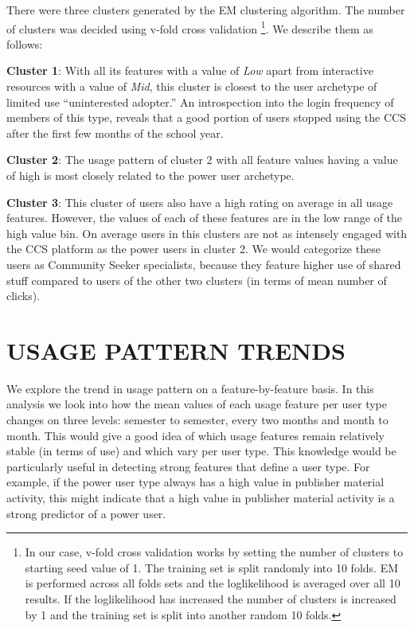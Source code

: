 \documentclass{acm_proc_article-sp}
\begin{document}
There were three clusters generated by the EM clustering algorithm. The number of clusters was decided using v-fold cross validation \footnote{In our case, v-fold cross validation works by setting the number of clusters to starting seed value of 1. The training set is split randomly into 10 folds. EM is performed across all folds sets and the loglikelihood is averaged over all 10 results. If the loglikelihood has increased the number of clusters is increased by 1 and the training set is split into another random 10 folds.}. We describe them as follows:

\textbf{Cluster 1}: With all its features with a value of \textit{Low} apart from interactive resources with a value of \textit{Mid}, this cluster is closest to the user archetype of limited use ``uninterested adopter.'' An introspection into the login frequency of members of this type, reveals that a good portion of users stopped using the CCS after the first few months of the school year.

\textbf{Cluster 2}: The usage pattern of cluster 2 with all feature values having a value of high is most closely related to the power user archetype.

\textbf{Cluster 3}: This cluster of users also have a high rating on average in all usage features. However, the values of each of these features are in the low range of the high value bin. On average users in this clusters are not as intensely engaged with the CCS platform as the power users in cluster 2. We would categorize these users as Community Seeker specialists, because they feature higher use of shared stuff compared to users of the other two clusters (in terms of mean number of clicks).

\section{USAGE PATTERN TRENDS}
We explore the trend in usage pattern on a feature-by-feature basis. In this analysis we look into how the mean values of each usage feature per user type changes on three levels: semester to semester, every two months and month to month. This would give a good idea of which usage features remain relatively stable (in terms of use) and which vary per user type. This knowledge would be particularly useful in detecting strong features that define a user type. For example, if the power user type always has a high value in  publisher material activity, this  might indicate that a high value in publisher material activity is a strong predictor of a power user.
\end{document}
